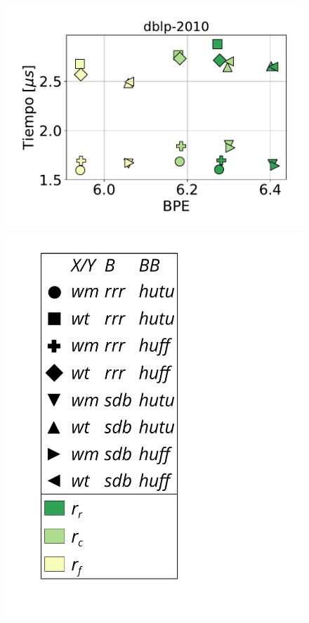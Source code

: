\begin{figure}
    	\begin{minipage}{1\textwidth}
    		\centering
    		\begin{minipage}{0.45\textwidth}
    			\centering
    			\begin{minipage}{0.75\textwidth}
    				\centering
    				\includegraphics[width=1\linewidth]{img/sdsl/secuencial/dblp-2010.pdf}
    			\end{minipage}
    			\begin{minipage}{0.2\textwidth}
    				\centering
    				\includegraphics[scale=.16, clip, trim=70 0 0 0]{img/sdsl/label.pdf}
    			\end{minipage}
    			

\end{minipage}
\end{minipage}
\end{figure}
